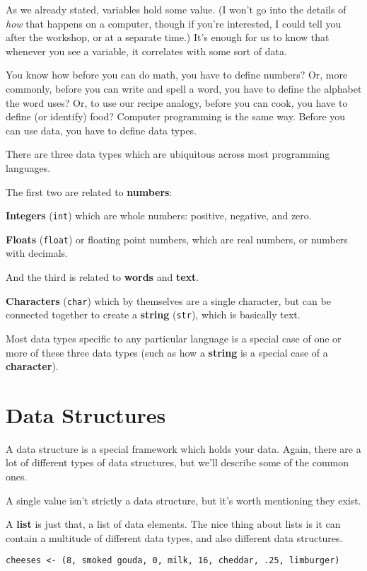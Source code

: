\documentclass[
]{book}
\begin{document}
As we already stated, variables hold some value. (I won't go into the details of \emph{how} that happens on a computer, though if you're interested, I could tell you after the workshop, or at a separate time.) It's enough for us to know that whenever you see a variable, it correlates with some sort of data.

You know how before you can do math, you have to define numbers? Or, more commonly, before you can write and spell a word, you have to define the alphabet the word uses? Or, to use our recipe analogy, before you can cook, you have to define (or identify) food? Computer programming is the same way. Before you can use data, you have to define data types.

There are three data types which are ubiquitous across most programming languages.

The first two are related to \textbf{numbers}:

\textbf{Integers} (\texttt{int}) which are whole numbers: positive, negative, and zero.

\textbf{Floats} (\texttt{float}) or floating point numbers, which are real numbers, or numbers with decimals.

And the third is related to \textbf{words} and \textbf{text}.

\textbf{Characters} (\texttt{char}) which by themselves are a single character, but can be connected together to create a \textbf{string} (\texttt{str}), which is basically text.

Most data types specific to any particular language is a special case of one or more of these three data types (such as how a \textbf{string} is a special case of a \textbf{character}).

\section{Data Structures}\label{data-structures}

A data structure is a special framework which holds your data. Again, there are a lot of different types of data structures, but we'll describe some of the common ones.

A single value isn't strictly a data structure, but it's worth mentioning they exist.

A \textbf{list} is just that, a list of data elements. The nice thing about lists is it can contain a multitude of different data types, and also different data structures.

\texttt{cheeses\ \textless{}-\ (8,\ smoked\ gouda,\ 0,\ milk,\ 16,\ cheddar,\ .25,\ limburger)}
\end{document}
